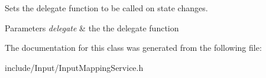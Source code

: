 Sets the delegate function to be called on state changes.


\begin{DoxyParams}{Parameters}
{\em delegate} & the the delegate function \\
\hline
\end{DoxyParams}


The documentation for this class was generated from the following file\+:\begin{DoxyCompactItemize}
\item 
include/\+Input/Input\+Mapping\+Service.\+h\end{DoxyCompactItemize}
